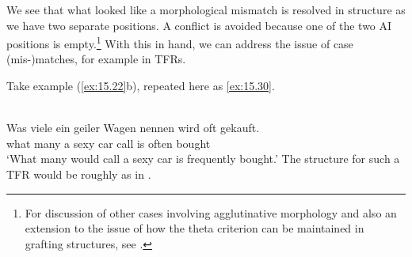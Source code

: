 \documentclass[output=paper]{langsci/langscibook}
\begin{document}
\begin{refcontext}
\begin{figure}[p]
\end{figure}


We see that what looked like a morphological mismatch is resolved in structure
 as we have two separate positions.  A conflict is avoided because one of
the two AI positions is empty.\footnote{For discussion of other cases involving
agglutinative morphology and also an extension to the issue of how the theta
criterion can be maintained in grafting structures, see \citet{VanRiemsdijk2010}.} With this in hand, we can address the issue of case
(mis-)matches, for example in \glspl{TFR}.\clearpage

Take example (\ref{ex:15.22}b), repeated here as \eqref{ex:15.30}.

\ea{}\\
    \gll   \llap{*}Was viele ein\tss{\Nom{}} geiler\tss{\Nom{}} Wagen nennen\textsuperscript{\Acc{}} wird oft gekauft\textsuperscript{\Nom{}}.\\
            what many a          sexy          car       call            is      often bought\\
    \glt    ‘What many would call a sexy car is frequently bought.’\label{ex:15.30}
\z
The structure for such a \gls{TFR} would be roughly as in .


\end{refcontext}
\end{document}
